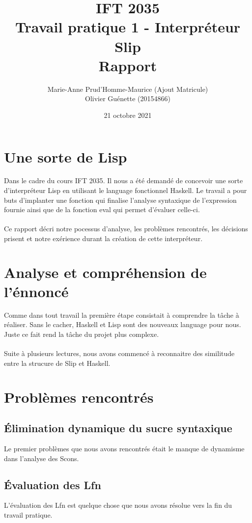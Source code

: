 \documentclass[12pt, letterpaper]{article}
\title{IFT 2035 \\ Travail pratique 1 - Interpréteur Slip \\ Rapport }
\author{ Marie-Anne Prud'Homme-Maurice (Ajout Matricule) 
\\ Olivier Guénette (20154866)}
\date{21 octobre 2021}
\begin{document}
\maketitle

\section*{Une sorte de Lisp}

Dans le cadre du cours IFT 2035. Il nous a été demandé de concevoir une sorte
d'interpréteur Lisp en utilisant le language fonctionnel Haskell. Le travail
a pour buts d'implanter une fonction qui finalise l'analyse syntaxique de
l'expression fournie ainsi que de la fonction eval qui permet d'évaluer
celle-ci.
\\
\\
Ce rapport décri notre pocessus d'analyse, les problèmes rencontrés,
les décisions prisent et notre exérience durant la création de
cette interpréteur.

\section*{Analyse et compréhension de l'énnoncé}

Comme dans tout travail la première étape consistait à comprendre la tâche à
réaliser.  Sans le cacher, Haskell et Lisp sont des nouveaux language pour nous.
Juste ce fait rend la tâche du projet plus complexe.
\\
\\
Suite à plusieurs lectures, nous avons commencé à reconnaitre des similitude
entre la strucure de Slip et Haskell.

\section*{Problèmes rencontrés}

\subsection*{Élimination dynamique du sucre syntaxique}
Le premier problèmes que nous avons rencontrés était le manque de dynamisme
dans l'analyse des Scons.

\subsection*{Évaluation des Lfn}
L'évaluation des Lfn est quelque chose que nous avons résolue vers la fin du
travail pratique.
\end{document}
